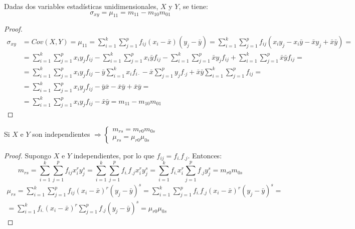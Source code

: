 \begin{prop} Dadas dos variables estadísticas unidimensionales, $X$ y $Y$, se tiene:
    $$\sigma_{xy} = \mu_{11} = m_{11} - m_{10}m_{01}$$
\end{prop}
\begin{proof}
    \begin{equation*}\begin{split}
    \sigma_{xy} &=  Cov(X,Y) = \mu_{11} = \sum_{i=1}^k \sum_{j=1}^p f_{ij}(x_i - \bar{x})(y_j - \bar{y}) = \sum_{i=1}^k \sum_{j=1}^p f_{ij}(x_iy_j - x_i\bar{y} - \bar{x}y_j + \bar{x}\bar{y})
    =\\&=
    \sum_{i=1}^k \sum_{j=1}^px_iy_jf_{ij} - \sum_{i=1}^k \sum_{j=1}^p x_i\bar{y}f_{ij} - \sum_{i=1}^k \sum_{j=1}^p\bar{x}y_jf_{ij} + \sum_{i=1}^k \sum_{j=1}^p \bar{x}\bar{y} f_{ij}
    =\\&=
    \sum_{i=1}^k \sum_{j=1}^px_iy_jf_{ij} - \bar{y}\sum_{i=1}^k x_if_{i\cdot} - \bar{x}\sum_{j=1}^p y_jf_{\cdot j} + \bar{x}\bar{y}\sum_{i=1}^k \sum_{j=1}^pf_{ij}
    =\\&=
    \sum_{i=1}^k \sum_{j=1}^p x_iy_jf_{ij} - \bar{y}\bar{x} - \bar{x}\bar{y} + \bar{x}\bar{y}
    =\\&=
    \sum_{i=1}^k \sum_{j=1}^px_iy_jf_{ij} - \bar{x}\bar{y} = m_{11} - m_{10}m_{01}
\end{split}\end{equation*}
\end{proof}


\begin{prop}
    Si $X$ e $Y$ son independientes $\Longrightarrow \left\{ \begin{array}{c}
        m_{rs}=m_{r0}m_{0s}  \\
        \mu_{rs}=\mu_{r0}\mu_{0s} 
    \end{array}\right.$
\end{prop}
\begin{proof} Supongo $X$ e $Y$ independientes, por lo que $f_{ij}=f_{i.}f_{.j}$. Entonces:
    \begin{equation*}
        m_{rs} = \sum_{i=1}^k \sum_{j=1}^p f_{ij}x_i^r y_j^s
        = \sum_{i=1}^k \sum_{j=1}^p f_{i.}f_{.j}x_i^r y_j^s
        = \sum_{i=1}^k f_{i.}x_i^r \sum_{j=1}^p f_{.j} y_j^s
        = m_{r0}m_{0s}
    \end{equation*}
    \begin{multline*}
        \mu_{rs} = \sum_{i=1}^k \sum_{j=1}^p f_{ij}(x_i-\bar{x})^r (y_j-\bar{y})^s
        = \sum_{i=1}^k \sum_{j=1}^p f_{i.}f_{.j}(x_i-\bar{x})^r (y_j-\bar{y})^s
        =\\=
        \sum_{i=1}^k f_{i.}(x_i-\bar{x})^r \sum_{j=1}^p f_{.j} (y_j-\bar{y})^s
        = \mu_{r0}\mu_{0s}
    \end{multline*}
\end{proof}

